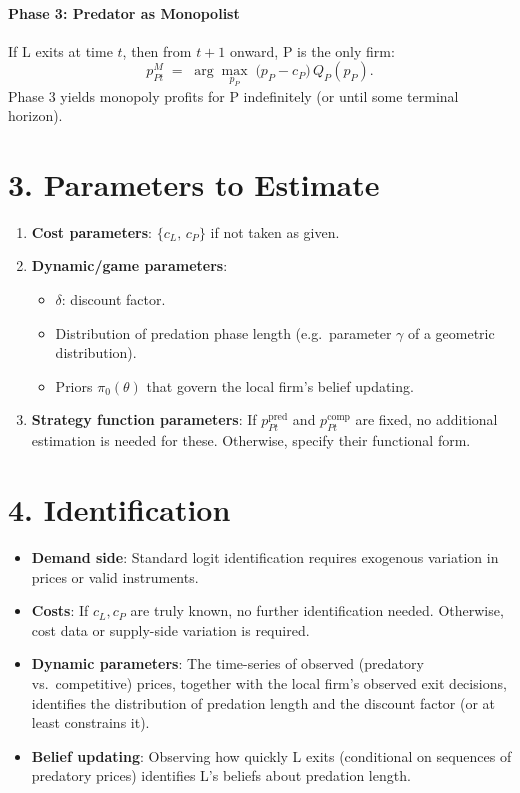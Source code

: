 \documentclass[12pt,oneside]{article}
\theoremstyle{definition}
\theoremstyle{remark}
\begin{document}
\paragraph{Phase 3: Predator as Monopolist}

If L exits at time $t$, then from $t+1$ onward, P is the only firm:
\[
p_{Pt}^M
\;=\;
\arg\max_{p_P}\;\bigl(p_P-c_P\bigr)\,Q_P(p_P).
\]
Phase 3 yields monopoly profits for P indefinitely (or until some terminal horizon).

\section{3. Parameters to Estimate}

\begin{enumerate}
  \item \textbf{Cost parameters}: $\{c_L,\,c_P\}$ if not taken as given.
  \item \textbf{Dynamic/game parameters}:
  \begin{itemize}
    \item $\delta$: discount factor.
    \item Distribution of predation phase length (e.g.\ parameter $\gamma$ of a geometric distribution).
    \item Priors $\pi_0(\theta)$ that govern the local firm's belief updating.
  \end{itemize}
  \item \textbf{Strategy function parameters}: If $p_{Pt}^{\text{pred}}$ and $p_{Pt}^{\text{comp}}$ are fixed, no additional estimation is needed for these. Otherwise, specify their functional form.
\end{enumerate}

\section{4. Identification}

\begin{itemize}
  \item \textbf{Demand side}: Standard logit identification requires exogenous variation in prices or valid instruments.
  \item \textbf{Costs}: If $c_L,c_P$ are truly known, no further identification needed. Otherwise, cost data or supply-side variation is required.
  \item \textbf{Dynamic parameters}: The time-series of observed (predatory vs.\ competitive) prices, together with the local firm's observed exit decisions, identifies the distribution of predation length and the discount factor (or at least constrains it).
  \item \textbf{Belief updating}: Observing how quickly L exits (conditional on sequences of predatory prices) identifies L's beliefs about predation length.
\end{itemize}
\end{document}
